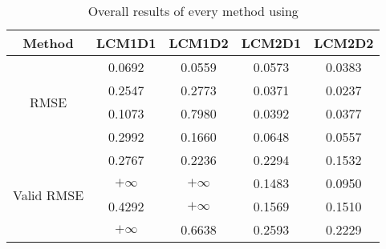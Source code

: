 \begin{table}[ht!]
\centering
\begin{tabular}{c|c|c|c|c}
Method & \scriptsize{LCM1D1} & \scriptsize{LCM1D2} & \scriptsize{LCM2D1} & \scriptsize{LCM2D2}\\ \hline 
\multirow{4}{*}{RMSE} & 0.0692 & 0.0559 & 0.0573 & 0.0383 \\ 
 & 0.2547 & 0.2773 & 0.0371 & 0.0237 \\ 
 & 0.1073 & 0.7980 & 0.0392 & 0.0377 \\ 
 & 0.2992 & 0.1660 & 0.0648 & 0.0557 \\ 
 \hline
\multirow{4}{*}{Valid RMSE} & 0.2767 & 0.2236 & 0.2294 & 0.1532 \\ 
 & $+\infty$ & $+\infty$ & 0.1483 & 0.0950 \\ 
 & 0.4292 & $+\infty$ & 0.1569 & 0.1510 \\ 
 & $+\infty$ & 0.6638 & 0.2593 & 0.2229 \\ 
 \hline 
\end{tabular}
\caption{Overall results of every method using }
\label{tab:FIT}
\end{table}


